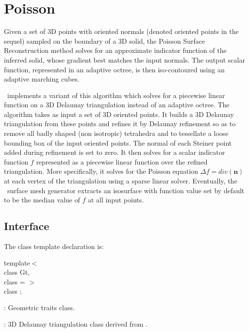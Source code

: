 \section{Poisson}

Given a set of 3D points with oriented normals (denoted oriented points in the sequel) sampled on the boundary of a 3D solid, the Poisson Surface Reconstruction method \cite{Kazhdan06} solves for an approximate indicator function of the inferred solid, whose gradient best matches the input normals. The output scalar function, represented in an adaptive octree, is then iso-contoured using an adaptive marching cubes.

\cgal\ implements a variant of this algorithm which solves for a piecewise linear function on a 3D Delaunay triangulation instead of an adaptive octree. The algorithm takes as input a set of 3D oriented points. It builds a 3D Delaunay triangulation from these points and refines it by Delaunay refinement so as to remove all badly shaped (non isotropic) tetrahedra and to tessellate a loose bounding box of the input oriented points. The normal of each Steiner point added during refinement is set to zero. It then solves for a scalar indicator function $f$ represented as a piecewise linear function over the refined triangulation. More specifically, it solves for the Poisson equation  $\Delta f = div(\mathbf{n})$ at each vertex of the triangulation using a sparse linear solver. Eventually, the \cgal\ surface mesh generator extracts an isosurface with function value set by default to be the median value of $f$ at all input points.

\subsection{Interface}

The class template declaration is:

template$<$  \\
class Gt,   \\
class  = $>$   \\
class ;
\ccGlue
{}
\begin{description}
\item {}: Geometric traits class. \item {}: 3D Delaunay triangulation class derived from . \end{description}

